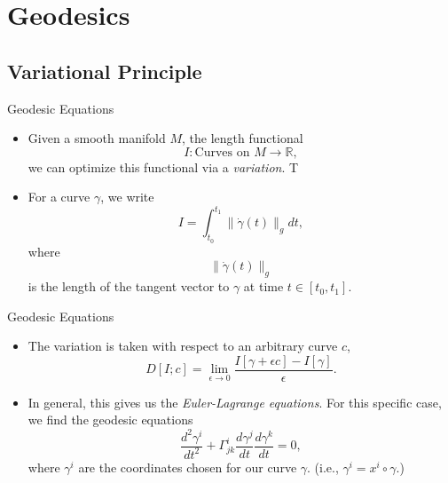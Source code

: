 \documentclass[usenames,dvipsnames]{beamer}
\theoremstyle{definition}
\theoremstyle{theorem}
\newcommand{\R}{\mathbb{R}}
\begin{document}
\section{Geodesics}
    \subsection{Variational Principle}
    \begin{frame}{Geodesic Equations}
    \begin{itemize}
        \item Given a smooth manifold $M$, the length functional
        \[
        I \colon \textrm{Curves on $M$} \to \R,
        \]
        we can optimize this functional via a \emph{variation}. T
        \item For a curve $\gamma$, we write
        \[
        I = \int_{t_0}^{t_1} \|\dot{\gamma}(t)\|_g dt, 
        \]
        where
        \[
        \|\dot{\gamma}(t)\|_g
        \]
        is the length of the tangent vector to $\gamma$ at time $t\in [t_0,t_1]$.
    \end{itemize}
    \end{frame}
    
    \begin{frame}{Geodesic Equations}
    \begin{itemize}
        \item The variation is taken with respect to an arbitrary curve $c$,
        \[
        D[I;c] = \lim_{\epsilon \to 0} \frac{ I[\gamma + \epsilon c] - I[\gamma]}{\epsilon}.
        \]
        \item In general, this gives us the \emph{Euler-Lagrange equations}.  For this specific case, we find the geodesic equations
        \[
        \frac{d^2 \gamma^i}{dt^2}+\Gamma_{jk}^i \frac{d\gamma^j}{dt}\frac{d\gamma^k}{dt}=0,
        \]
        where $\gamma^i$ are the coordinates chosen for our curve $\gamma$. (i.e., $\gamma^i=x^i \circ \gamma$.)
    \end{itemize}
    \end{frame}
    
\end{document}
